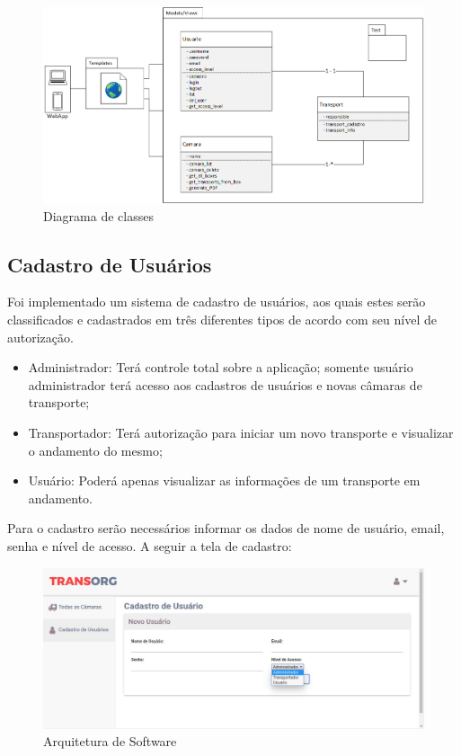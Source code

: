 \begin{figure}[H]
	\centering
	\includegraphics[width=16cm]{figuras/diagrama_classe.png}
	\caption{Diagrama de classes}
\end{figure}


\subsection{Cadastro de Usuários}
	Foi implementado um sistema de cadastro de usuários, aos quais estes serão classificados e cadastrados em três diferentes tipos de acordo com seu nível de autorização.

\begin{itemize}
\item Administrador: Terá controle total sobre a aplicação; somente usuário administrador terá acesso aos cadastros de usuários e novas câmaras de transporte;
\item Transportador:  Terá autorização para iniciar um novo transporte e visualizar o andamento do mesmo;
\item Usuário: Poderá apenas visualizar as informações de um transporte em andamento.
\end{itemize}

	Para o cadastro serão necessários informar os dados de nome de usuário, email, senha e nível de acesso. A seguir a tela de cadastro:

\begin{figure}[H]
\centering
\includegraphics[width=16cm]{figuras/cadastro_software.JPG}
\caption{Arquitetura de Software}
\end{figure}

